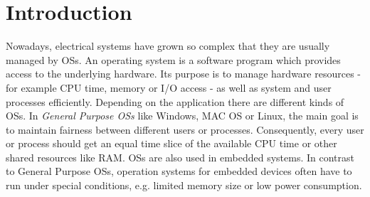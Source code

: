 \chapter{Introduction}
Nowadays, electrical systems have grown so complex that they are usually managed by \acp{OS}. 
An operating system is a software program which provides access to the underlying hardware. 
Its purpose is to manage hardware resources - for example \ac{CPU} time, memory or \ac{I/O} access - as well as system and user processes efficiently. 
Depending on the application there are different kinds of \acp{OS}. 
In \textit{General Purpose \acp{OS}} like Windows, \ac{MAC} OS or Linux, the main goal is to maintain fairness between different users or processes. 
Consequently, every user or process should get an equal time slice of the available \ac{CPU} time or other shared resources like \ac{RAM}. 
\acp{OS} are also used in embedded systems. 
In contrast to General Purpose \acp{OS}, operation systems for embedded devices often have to run under special conditions, e.g. limited memory size or low power consumption. 

